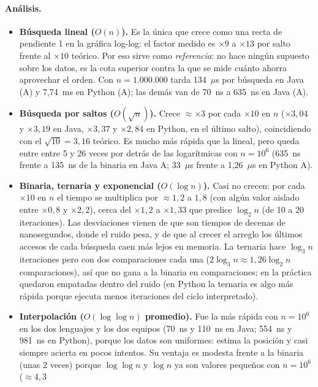 \documentclass[11pt,a4paper]{article}
\begin{document}
\paragraph{An\'alisis.}
\begin{itemize}
  \item \textbf{B\'usqueda lineal ($O(n)$).} Es la \'unica que crece como una recta de pendiente 1 en la gr\'afica
  log-log: el factor medido es $\times9$ a $\times13$ por salto frente al $\times10$ te\'orico. Por eso sirve
  como \emph{referencia}: no hace ning\'un supuesto sobre los datos, es la cota superior contra la que se mide
  cu\'anto ahorra aprovechar el orden. Con $n=1.000.000$ tarda 134~$\mu$s por b\'usqueda en Java (A) y 7,74~ms
  en Python (A); las dem\'as van de 70~ns a 635~ns en Java (A).
  \item \textbf{B\'usqueda por saltos ($O(\sqrt n)$).} Crece $\approx\times3$ por cada $\times10$ en $n$
  ($\times3{,}04$ y $\times3{,}19$ en Java, $\times3{,}37$ y $\times2{,}84$ en Python, en el \'ultimo salto),
  coincidiendo con el $\sqrt{10}=3{,}16$ te\'orico. Es mucho m\'as r\'apida que la lineal, pero queda entre
  entre 5 y 26 veces por detr\'as de las logar\'itmicas con $n=10^6$ (635~ns frente a 135~ns de la binaria en
  Java A; 33~$\mu$s frente a 1,26~$\mu$s en Python A).
  \item \textbf{Binaria, ternaria y exponencial ($O(\log n)$).} Casi no crecen: por cada $\times10$ en $n$
  el tiempo se multiplica por $\approx1{,}2$ a $1{,}8$ (con alg\'un valor aislado entre $\times0{,}8$ y
  $\times2{,}2$), cerca del $\times1{,}2$ a $\times1{,}33$ que predice $\log_2 n$ (de 10 a 20 iteraciones). Las desviaciones vienen de que son tiempos de decenas de nanosegundos,
  donde el ruido pesa, y de que al crecer el arreglo los \'ultimos accesos de cada b\'usqueda caen m\'as
  lejos en memoria. La ternaria hace $\log_3 n$ iteraciones pero con dos comparaciones cada una
  ($2\log_3 n\approx1{,}26\log_2 n$ comparaciones), as\'i que no gana a la binaria en comparaciones; en la
  pr\'actica quedaron empatadas dentro del ruido (en Python la ternaria es algo m\'as r\'apida porque ejecuta
  menos iteraciones del ciclo interpretado).
  \item \textbf{Interpolaci\'on ($O(\log\log n)$ promedio).} Fue la m\'as r\'apida con $n=10^6$ en los dos
  lenguajes y los dos equipos (70~ns y 110~ns en Java; 554~ns y 981~ns en Python), porque los datos son
  uniformes: estima la posici\'on y casi siempre acierta en pocos intentos. Su ventaja es modesta frente a la
  binaria (unas 2 veces) porque $\log\log n$ y $\log n$ ya son valores peque\~nos con $n=10^6$ ($\approx4{,}3$

\end{itemize}
\end{document}
